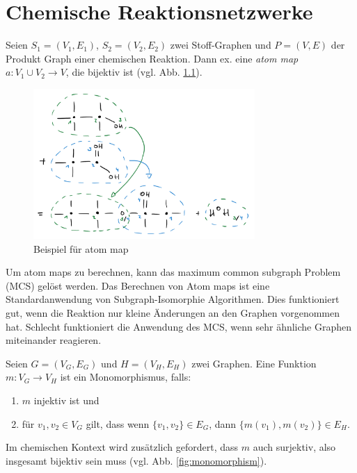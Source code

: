 \chapter{Chemische Reaktionsnetzwerke}

\begin{definition}
    Seien $ S_1 = (V_1, E_1)$, $ S_2 = (V_2, E_2) $ zwei Stoff-Graphen und $ P = (V, E) $ der Produkt Graph einer chemischen Reaktion.
    Dann ex. eine \textit{atom map} $ a : V_1 \cup V_2 \rightarrow V $, die bijektiv ist (vgl. Abb. \ref{fig:atom-map}).
\end{definition}

\begin{figure}
    \centering
    \includegraphics[width=0.75\textwidth]{figures/chem.png}
    \caption{Beispiel für atom map}
    \label{fig:atom-map}
\end{figure}

\begin{remark}
    Um atom maps zu berechnen, kann das maximum common subgraph Problem (MCS) gelöst werden.
    Das Berechnen von Atom maps ist eine Standardanwendung von Subgraph-Isomorphie Algorithmen.
    Dies funktioniert gut, wenn die Reaktion nur kleine Änderungen an den Graphen vorgenommen hat.
    Schlecht funktioniert die Anwendung des MCS, wenn sehr ähnliche Graphen miteinander reagieren.
\end{remark}

\begin{definition}[Monomorphismus]
    Seien $ G = (V_G, E_G) $ und $ H = (V_H, E_H)  $ zwei Graphen.
    Eine Funktion $ m : V_G \rightarrow V_H $ ist ein Monomorphismus, falls:
    \begin{enumerate}
        \item $ m $ injektiv ist und
        \item für $ v_1, v_2 \in V_G $ gilt, dass wenn $ \{ v_1, v_2 \} \in E_G $, dann $ \{ m(v_1), m(v_2) \} \in E_H $.
    \end{enumerate}

    Im chemischen Kontext wird zusätzlich gefordert, dass $ m $ auch surjektiv, also insgesamt bijektiv sein muss (vgl. Abb. \ref{fig:monomorphism}).
\end{definition}

